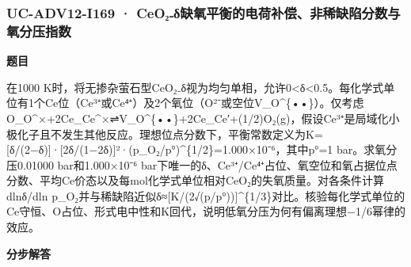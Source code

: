 \documentclass[UTF8,11pt,a4paper]{ctexart}
\begin{document}
\subsubsection*{UC-ADV12-I169 · CeO₂₋δ缺氧平衡的电荷补偿、非稀缺陷分数与氧分压指数}
\noindent\textbf{题目}\par
在1000 K时，将无掺杂萤石型CeO₂₋δ视为均匀单相，允许0<δ<0.5。每化学式单位有1个Ce位（Ce³⁺或Ce⁴⁺）及2个氧位（O²⁻或空位V\_O\textasciicircum{}\{••\}）。仅考虑O\_O\textasciicircum{}×+2Ce\_Ce\textasciicircum{}×⇌V\_O\textasciicircum{}\{••\}+2Ce\_Ce′+(1/2)O₂(g)，假设Ce³⁺是局域化小极化子且不发生其他反应。理想位点分数下，平衡常数定义为K=[δ/(2−δ)]·[2δ/(1−2δ)]²·(p\_O₂/p°)\textasciicircum{}\{1/2\}=1.000×10⁻⁶，其中p°=1 bar。求氧分压0.01000 bar和1.000×10⁻⁶ bar下唯一的δ、Ce³⁺/Ce⁴⁺占位、氧空位和氧占据位点分数、平均Ce价态以及每mol化学式单位相对CeO₂的失氧质量。对各条件计算dlnδ/dln p\_O₂并与稀缺陷近似δ≈[K/(2√(p/p°))]\textasciicircum{}\{1/3\}对比。核验每化学式单位的Ce守恒、O占位、形式电中性和K回代，说明低氧分压为何有偏离理想−1/6幂律的效应。\par
\medskip\noindent\textbf{分步解答}
\end{document}

